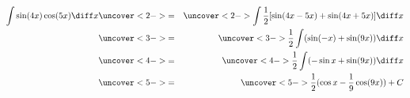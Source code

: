 \begin{frame}
\begin{example} %
\begin{eqnarray*}
\int \sin (4x) \cos (5x) \diff x & \uncover<2->{ = } & %
\uncover<2->{\int \frac{1}{2} [ \sin (4x - 5x) + \sin (4x + 5x)]\diff x}\\%
 & \uncover<3->{ = } & %
\uncover<3->{\frac{1}{2} \int  ( \sin (-x) + \sin (9x))\diff x}\\%
 & \uncover<4->{ = } & %
\uncover<4->{\frac{1}{2} \int  (-\sin x + \sin (9x))\diff x}\\%
 & \uncover<5->{ = } & %
\uncover<5->{\frac{1}{2}   (\cos x - \frac{1}{9}\cos (9x)) + C}\\%
\end{eqnarray*}
\end{example}
\end{frame}
